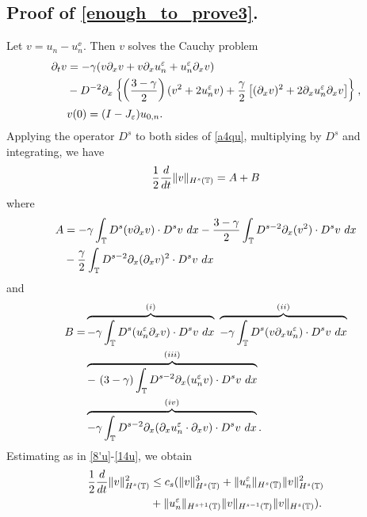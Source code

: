 \subsection{ Proof of \eqref{enough_to_prove3}.} 
Let $v = u_n - u^\ee_n$. Then $v$ solves the Cauchy problem
\begin{align}
		\label{a4qu}
		\partial_t v 
		& =  -\gamma (v \partial_x v + v \partial_x u^\varepsilon_n + u^\varepsilon_n \partial_x v)  
		\\
		& - D^{-2} \partial_x \left\{ \left (\frac{3-\gamma}{2} \right )(v^2 +
		2u^\varepsilon_n v) + \frac{\gamma}{2}\left[ (\partial_x v)^2 + 2 \partial_x u^\varepsilon_n \partial_x v \right]
		\right\}, \notag
		\\
		& v(0) = (I- J_\varepsilon)u_{0,n}.
		\label{a5qu}
	\end{align}
Applying the operator $D^s$ to both sides of \eqref{a4qu}, multiplying by
	$D^s$ and integrating, we have
	\begin{equation}
		\begin{split}
			\frac{1}{2}\frac{d}{dt} \|v\|_{H^s(\mathbb{T})} = A + B
			\label{a6qu}
		\end{split}
	\end{equation}
	where
	\begin{equation}
		\begin{split}
			A
			& =  -\gamma \int_{\mathbb{T}} D^s(v \partial_x v) \cdot D^s v \
			dx
			- \frac{3- \gamma}{2} \int_{\mathbb{T}} D^{s-2} \partial_x (v^2) \cdot D^s v
			\ dx
			\\
			& - \frac{\gamma}{2}\int_{\mathbb{T}} D^{s-2} \partial_x (\partial_x v)^2 \cdot D^s
			v \ dx
			\label{a7qu}
		\end{split}
	\end{equation}
	and
	\begin{equation}
		\begin{split}
			B 
			 = &  \overbrace{-\gamma \int_{\mathbb{T}} D^s (u^\varepsilon_n \partial_x v) \cdot D^s v \
			 dx}^{(i)}
			 \ \overbrace{-\gamma \int_{\mathbb{T}} D^s (v \partial_x u^\varepsilon_n ) \cdot D^s v \
			 dx}^{(ii)}
			 \\
			  & \overbrace{- \ ( 3- \gamma) \int_{\mathbb{T}} D^{s-2} \partial_x (u^\varepsilon_n v) \cdot D^s
			 v \ dx}^{(iii)}
			 \\
			 & \overbrace{-\gamma \int_{\mathbb{T}} D^{s-2} \partial_x
			(\partial_x u^\varepsilon_n \cdot \partial_x v) \cdot D^s v \
			dx}^{(iv)}.
			\label{a8qu}
		\end{split}
	\end{equation}
	Estimating as in \eqref{8'u}-\eqref{14u}, we obtain
	\begin{equation}
		\begin{split}
			\frac{1}{2}\frac{d}{dt}\|v\|_{H^{s}(\mathbb{T})}^2
			& \le c_s(\|v\|_{H^s(\mathbb{T})}^3 + \|u^\varepsilon_n\|_{H^s(\mathbb{T})}
			\|v\|_{H^s(\mathbb{T})}^2
			\\
			& + \|u^\varepsilon_n\|_{H^{s+1}(\mathbb{T})}
			\|v\|_{H^{s-1}(\mathbb{T})} \|v\|_{H^s(\mathbb{T})}).
			\label{a15qu}
		\end{split}
	\end{equation}
